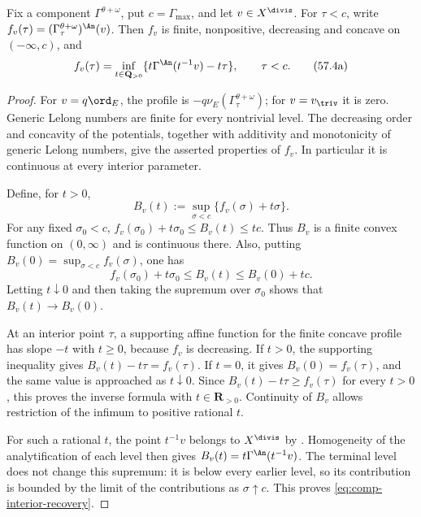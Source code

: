 \begin{lemma}
\label{lem:comp-interior-valuative-inversion}
Fix a component $\Gamma^{\theta+\omega}$, put
$c=\Gamma_{\max}$, and let $v\in X^{\divis}$.
For $\tau<c$, write
$f_v(\tau)=(\Gamma_\tau^{\theta+\omega})^{\An}(v)$.
Then $f_v$ is finite, nonpositive, decreasing and concave on
$(-\infty,c)$, and
\[
 f_v(\tau)=\inf_{t\in\mathbf Q_{>0}}
       \{t\Gamma^{\An}(t^{-1}v)-t\tau\},
                         \qquad \tau<c.
\tag{57.4a}\label{eq:comp-interior-recovery}
\]
\end{lemma}

\begin{proof}
For $v=q\ord_E$, the profile is $-q\nu_E(\Gamma_\tau^{\theta+\omega})$;
for $v=v_{\triv}$ it is zero. Generic Lelong numbers are finite
for every nontrivial level. The decreasing order and concavity of
the potentials, together with additivity and monotonicity of
generic Lelong numbers, give the asserted properties of $f_v$.
In particular it is continuous at every interior parameter.

Define, for $t>0$,
\[
 B_v(t):=\sup_{\sigma<c}\{f_v(\sigma)+t\sigma\}.
\]
For any fixed $\sigma_0<c$,
$f_v(\sigma_0)+t\sigma_0\leq B_v(t)\leq tc$.
Thus $B_v$ is a finite convex function on $(0,\infty)$ and is
continuous there. Also, putting $B_v(0)=\sup_{\sigma<c}f_v(\sigma)$,
one has
\[
 f_v(\sigma_0)+t\sigma_0\leq B_v(t)\leq B_v(0)+tc.
\]
Letting $t\downarrow0$ and then taking the supremum over $\sigma_0$
shows that $B_v(t)\to B_v(0)$.

At an interior point $\tau$, a supporting affine function for the
finite concave profile has slope $-t$ with $t\geq0$, because
$f_v$ is decreasing. If $t>0$, the supporting inequality gives
$B_v(t)-t\tau=f_v(\tau)$. If $t=0$, it gives
$B_v(0)=f_v(\tau)$, and the same value is approached as
$t\downarrow0$. Since $B_v(t)-t\tau\geq f_v(\tau)$ for every
$t>0$, this proves the inverse formula with $t\in\mathbf R_{>0}$.
Continuity of $B_v$ allows restriction of the infimum to positive
rational $t$.

For such a rational $t$, the point $t^{-1}v$ belongs to
$X^{\divis}$ by .
Homogeneity of the analytification of each level then gives
$B_v(t)=t\Gamma^{\An}(t^{-1}v)$.
The terminal level does not change this supremum: it is below
every earlier level, so its contribution is bounded by the limit
of the contributions as $\sigma\uparrow c$.
This proves \eqref{eq:comp-interior-recovery}.
\end{proof}

